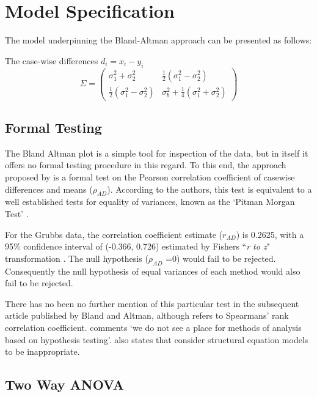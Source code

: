 \documentclass[12pt, a4paper]{report}
\theoremstyle{plain}
\theoremstyle{definition}
\theoremstyle{remark}
\begin{document}
\section{Model Specification}
The model underpinning the Bland-Altman approach can be presented as follows:



The case-wise differences $d_i = x_i - y_i$
\[
\Sigma = \left( \begin{array}{cc}
\sigma^2_1 + \sigma^2_2 &  \frac{1}{2}(\sigma^2_1 - \sigma^2_2) \\
\frac{1}{2}(\sigma^2_1 - \sigma^2_2) &   \sigma^2_b + \frac{1}{4}(\sigma^2_1 + \sigma^2_2)
\end{array}\right)
\]








\subsection{Formal Testing}
The Bland Altman plot is a simple tool for inspection of the data,
but in itself it offers no formal testing procedure in this regard. To this end, the approach proposed by \citet{BA83} is a formal test on the Pearson correlation coefficient  of casewise differences and means ($\rho_{AD}$). According to the authors, this test is equivalent to a well established tests for equality of variances, known as the `Pitman Morgan Test' \citep{Pitman,
	Morgan}.

For the Grubbs data, the correlation coefficient estimate ($r_{AD}$) is 0.2625, with a 95\% confidence interval of (-0.366,
0.726) estimated by Fishers ``\textit{r to z}" transformation \citep{Cohen}. The null hypothesis ($\rho_{AD}$ =0) would fail to be rejected.
Consequently the null hypothesis of equal variances of each method would also fail to be rejected.

There has no been no further mention of this particular test in the subsequent article published by Bland and Altman, although
\citet{BA99} refers to Spearmans' rank correlation coefficient. \citet{BA99} comments `we do not see a
place for methods of analysis based on hypothesis testing'. \citet{BA99} also states that consider structural equation models
to be inappropriate.

\subsection{Two Way ANOVA}
\end{document}
